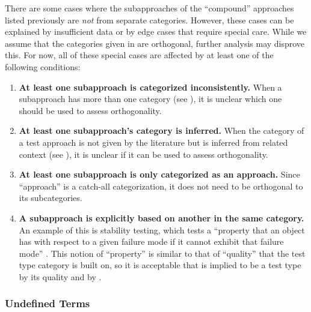 There are some cases where the subapproaches of the ``compound'' approaches
listed previously are \emph{not} from separate categories. However, these cases
can be explained by insufficient data or by edge cases that require special care.
While we assume that the categories given in  are
orthogonal, further analysis may disprove this. For now, all of these special
cases are affected by at least one of the following conditions:
\begin{enumerate}
    \item \textbf{At least one subapproach is categorized inconsistently.}
          When a subapproach has more than one category (see ),
          it is unclear which one should be used to assess orthogonality.
    \item \textbf{At least one subapproach's category is inferred.} When the category
          of a test approach is not given by the literature but is inferred
          from related context (see ), it is unclear if it can
          be used to assess orthogonality.
    \item \textbf{At least one subapproach is only categorized as an approach.}
          Since ``approach'' is a catch-all categorization, it does not
          need to be orthogonal to its subcategories.
    \item \textbf{A subapproach is explicitly based on another in the same
              category.} An example of this is stability testing, which
          tests a ``property that an object has with respect to a given
          failure mode if it cannot exhibit that failure mode''
          \citep[p.~434]{IEEE2017}. This notion of
          ``property'' is similar to that of ``quality'' that the test type
          category is built on, so it is acceptable that is implied to be
          a test type by its quality \citep[p.~434]{IEEE2017}%
           and by \citet[p.~55]{Firesmith2015}.
\end{enumerate}
\fi

\subsubsection{Undefined Terms}
\label{undef-terms}

